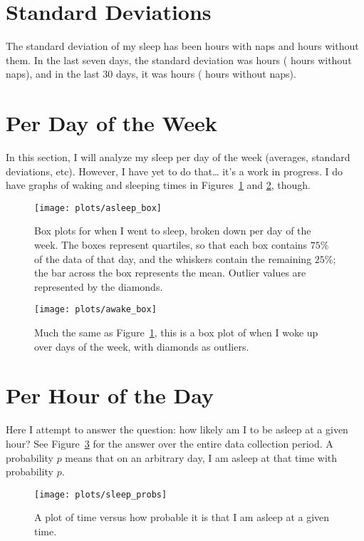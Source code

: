 \documentclass{amsart}
\begin{document}

\section{Standard Deviations}
The standard deviation of my sleep has been  hours with naps and  hours without them. In the last seven days, the standard deviation was  hours ( hours without naps), and in the last 30 days, it was  hours ( hours without naps).

\section{Per Day of the Week}
In this section, I will analyze my sleep per day of the week (averages, standard deviations, etc). However, I have yet to do that\dots{} it's a work in progress. I do have graphs of waking and sleeping times in Figures~\ref{asleep_weekly} and \ref{awake_weekly}, though.

\begin{figure}[h!]
\centering
\label{asleep_weekly}
\texttt{[image: plots/asleep\_box]}
\caption{Box plots for when I went to sleep, broken down per day of the week. The boxes represent quartiles, so that each box contains $75\%$ of the data of that day, and the whiskers contain the remaining $25\%$; the bar across the box represents the mean. Outlier values are represented by the diamonds.}
\end{figure}
\begin{figure}[h!]
\centering
\label{awake_weekly}
\texttt{[image: plots/awake\_box]}
\caption{Much the same as Figure~\ref{asleep_weekly}, this is a box plot of when I woke up over days of the week, with diamonds as outliers.}
\end{figure}

\section{Per Hour of the Day}
Here I attempt to answer the question: how likely am I to be asleep at a given hour? %
See Figure~\ref{probs} for the answer over the entire data collection period. A probability $p$ means that on an arbitrary day, I am asleep at that time with probability $p$.
\begin{figure}[h!]
	\centering
	\label{probs}
	\texttt{[image: plots/sleep\_probs]}
	\caption{A plot of time versus how probable it is that I am asleep at a given time.}
\end{figure}
\end{document}
